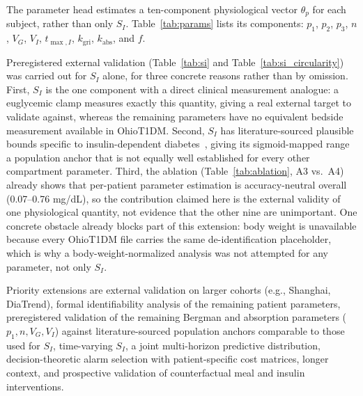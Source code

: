 \documentclass[journal]{IEEEtran}
\begin{document}
The parameter head estimates a ten-component physiological vector $\theta_p$ for each subject, rather than only $S_I$. Table~\ref{tab:params} lists its components: $p_1$, $p_2$, $p_3$, $n$, $V_G$, $V_I$, $t_{\max,I}$, $k_{\text{gri}}$, $k_{\text{abs}}$, and $f$.

Preregistered external validation (Table~\ref{tab:si} and Table~\ref{tab:si_circularity}) was carried out for $S_I$ alone, for three concrete reasons rather than by omission. First, $S_I$ is the one component with a direct clinical measurement analogue: a euglycemic clamp measures exactly this quantity, giving a real external target to validate against, whereas the remaining parameters have no equivalent bedside measurement available in OhioT1DM\@. Second, $S_I$ has literature-sourced plausible bounds specific to insulin-dependent diabetes~\cite{ref33}, giving its sigmoid-mapped range a population anchor that is not equally well established for every other compartment parameter. Third, the ablation (Table~\ref{tab:ablation}, A3 vs.\ A4) already shows that per-patient parameter estimation is accuracy-neutral overall (0.07--0.76 mg/dL), so the contribution claimed here is the external validity of one physiological quantity, not evidence that the other nine are unimportant. One concrete obstacle already blocks part of this extension: body weight is unavailable because every OhioT1DM file carries the same de-identification placeholder, which is why a body-weight-normalized analysis was not attempted for any parameter, not only $S_I$.

Priority extensions are external validation on larger cohorts (e.g., Shanghai, DiaTrend), formal identifiability analysis of the remaining patient parameters, preregistered validation of the remaining Bergman and absorption parameters ($p_1, n, V_G, V_I$) against literature-sourced population anchors comparable to those used for $S_I$, time-varying $S_I$, a joint multi-horizon predictive distribution, decision-theoretic alarm selection with patient-specific cost matrices, longer context, and prospective validation of counterfactual meal and insulin interventions.

\end{document}
